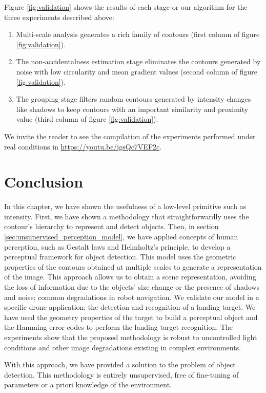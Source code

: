 Figure \ref{fig:validation} shows the results of each stage or our algorithm for the three experiments described above:

\begin{enumerate}
	\item Multi-scale analysis generates a rich family of contours (first column of figure \ref{fig:validation}).
	\item The non-accidentalness estimation stage eliminates the contours generated by noise with low circularity and mean gradient values (second column of figure \ref{fig:validation}).
	\item The grouping stage filters random contours generated by intensity changes like shadows to keep contours with an important similarity and proximity value (third column of figure \ref{fig:validation}).
\end{enumerate}
We invite the reader to see the compilation of the experiments performed under real conditions in \url{https://youtu.be/igsQc7VEF2c}.

\section{Conclusion}\label{sec:conclusions_landing_target}
In this chapter, we have shown the usefulness of a low-level primitive such as intensity. First, we have shown a methodology that straightforwardly uses the contour's hierarchy to represent and detect objects. Then, in section \ref{sec:unsupervised_perception_model}, we have applied concepts of human perception, such as Gestalt laws and Helmholtz's principle, to develop a perceptual framework for object detection. This model uses the geometric properties of the contours obtained at multiple scales to generate a representation of the image. This approach allows us to obtain a scene representation, avoiding the loss of information due to the objects' size change or the presence of shadows and noise; common degradations in robot navigation. We validate our model in a specific drone application; the detection and recognition of a landing target. We have used the geometry properties of the target to build a perceptual object and the Hamming error codes to perform the landing target recognition. The experiments show that the proposed methodology is robust to uncontrolled light conditions and other image degradations existing in complex environments.

With this approach, we have provided a solution to the problem of object detection. This methodology is entirely unsupervised, free of fine-tuning of parameters or a priori knowledge of the environment. 

